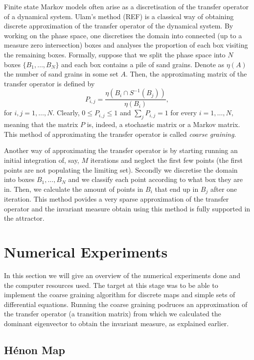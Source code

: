 Finite state Markov models often arise as a discretisation of the transfer operator of a dynamical system. Ulam's method (REF) is a classical way of obtaining discrete approximation of the transfer operator of the dynamical system. By working on the phase space, one discretises the domain into connected (up to a measure zero intersection) boxes and analyses the proportion of each box visiting the remaining boxes. Formally, suppose that we split the phase space into $N$ boxes $\{B_1,\ldots,B_N\}$ and each box contains a pile of sand grains. Denote as $\eta (A)$ the number of sand grains in some set $A$. Then, the approximating matrix of the transfer operator is defined by
\begin{equation}
	P_{i,j}=\frac{\eta(B_i \cap S^{-1}(B_j))}{\eta (B_i)},
\end{equation}
for $i,j=1,\ldots , N$. Clearly, $0\leq P_{i,j}\leq 1$ and $\sum _j P_{i,j}=1$ for every $i=1,\ldots , N,$ meaning that the matrix $P$ is, indeed, a stochastic matrix or a Markov matrix. This method of approximating the transfer operator is called \emph{coarse graining}.

Another way of approximating the transfer operator is by starting running an initial integration of, say, $M$ iterations and neglect the first few points (the first points are not populating the limiting set). Secondly we discretise the domain into boxes $B_1,\ldots ,B_N$ and we classify each point according to what box they are in. Then, we calculate the amount of points in $B_i$ that end up in $B_j$ after one iteration. This method povides a very sparse approximation of the transfer operator and the invariant measure obtain using this method is fully supported in the attractor.


\pagebreak

\section*{Numerical Experiments}

In this section we will give an overview of the numerical experiments done and the computer resources used. The target at this stage was to be able to implement the coarse graining algorithm for discrete maps and simple sets of differential equations. Running the coarse graining podruces an approximation of the transfer operator (a transition matrix) from which we calculated the dominant eigenvector to obtain the invariant measure, as explained earlier.

\subsection{H\'{e}non Map}

